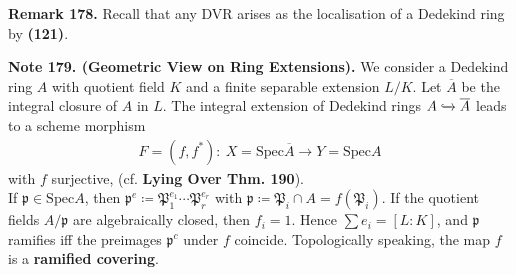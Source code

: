 \documentclass[12pt,a4paper,footinclude=true,headinclude=true]{scrbook} %
\newenvironment{remark}[2][Remark]
    { \begin{mdframed}[backgroundcolor=gray!20] \textbf{#1 #2.} }
    {  \end{mdframed}}
\newenvironment{nt}[2][Note]
    { \begin{mdframed}[backgroundcolor=gray!20] \textbf{#1 #2.} }
    {  \end{mdframed}}
\begin{document}
\begin{remark}{178}
    Recall that any DVR arises as the localisation of a Dedekind ring by \textbf{(121)}.
\end{remark}

\begin{nt}{179. (Geometric View on Ring Extensions)}
    We consider a Dedekind ring $A$ with quotient field $K$ and a finite separable extension $L/K$. Let $\overline{A}$ be the integral closure of $A$ in $L$. The integral extension of Dedekind rings $A\xhookrightarrow{} \overline{A}$ leads to a scheme morphism 
    \begin{align*}
        F=(f,f^\ast):\ X=\mathrm{Spec}\overline{A}\to Y=\mathrm{Spec}A
    \end{align*}
    with $f$ surjective, (cf. \textbf{Lying Over Thm. 190}).\\
    If $\mathfrak{p}\in\mathrm{Spec}A$, then $\mathfrak{p}^e\coloneqq \mathfrak{P}_1^{e_1}\cdots\mathfrak{P}_r^{e_r}$ with $\mathfrak{p}\coloneqq \mathfrak{P}_i\cap A=f(\mathfrak{P}_i)$. If the quotient fields $A/\mathfrak{p}$ are algebraically closed, then $f_i=1$. Hence $\sum e_i=[L:K]$, and $\mathfrak{p}$ ramifies iff the preimages $\mathfrak{p}^c$ under $f$ coincide. Topologically speaking, the map $f$ is a \textbf{ramified covering}.
\end{nt}
\end{document}
